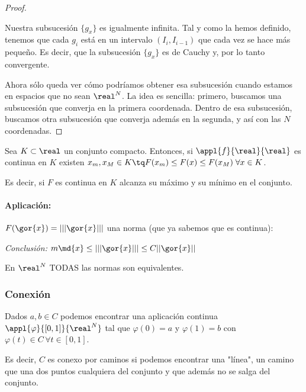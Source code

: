 \documentclass{apuntes}
\begin{document}
\begin{proof}
\begin{center}
\end{center}

Nuestra subsucesión $\{g_x\}$ es igualmente infinita. Tal y como la hemos definido, tenemos que cada $g_i$ está en un intervalo $(I_i, I_{i-1})$ que cada vez se hace más pequeño. Es decir, que la subsucesión $\{g_x\}$ es de Cauchy y, por lo tanto convergente.

Ahora sólo queda ver cómo podríamos obtener esa subsucesión cuando estamos en espacios que no sean $\real^N$. La idea es sencilla: primero, buscamos una subsucesión que converja en la primera coordenada. Dentro de esa subsucesión, buscamos otra subsucesión que converja además en la segunda, y así con las $N$ coordenadas. 
\end{proof}

\begin{theorem} \label{thmCompactoMax} Sea $K\subset \real$ un conjunto compacto. Entonces, si $\appl{f}{\real}{\real}$ es continua en $K$ existen  $x_m,x_M \in K \tq F(x_m) \leq F(x) \leq F(x_M)\;\forall x \in K$.

Es decir, si $F$ es continua en $K$ alcanza su máximo y su mínimo en el conjunto.
\end{theorem}

\paragraph{Aplicación:}
$F(\gor{x}) = |||\gor{x}|||$ una norma (que ya sabemos que es continua):

\emph{Conclusión:} $m \md{x} \leq |||\gor{x}||| \leq C||\gor{x}||$

\begin{theorem}
En $\real^N$ TODAS las normas son equivalentes. 
\end{theorem}

\subsubsection{Conexión}
\begin{defn}
Dados $a,b \in C$ podemos encontrar una aplicación continua $\appl{\varphi}{[0,1]}{\real^N}$ tal que $\varphi(0) = a$ y  $\varphi(1) = b$ con $ \varphi(t) \in C\, \forall t \in [0,1]$. 

Es decir, $C$ es conexo por caminos si podemos encontrar una "línea", un camino que una dos puntos cualquiera del conjunto y que además no se salga del conjunto.
\end{defn}
\end{document}
